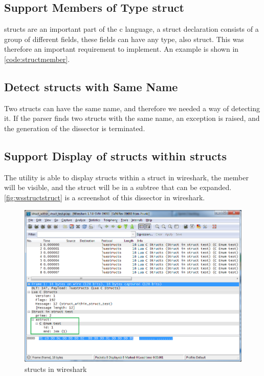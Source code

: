

\subsection{Support Members of Type \Gls{struct}}
\Glspl{struct} are an important part of the \Gls{c} language, a \gls{struct} declaration consists 
of a group of different fields, these fields can have any type, also \gls{struct}. 
This was therefore an important requirement to implement. An example is shown 
in \autoref{code:structmember}.



\subsection{Detect \Glspl{struct} with Same Name}
Two \glspl{struct} can have the same name, and therefore we needed a way of detecting it. 
If the \gls{parser} finds two \glspl{struct} with the same name, an exception is 
raised, and the generation of the \gls{dissector} is terminated.

\subsection{Support Display of \Glspl{struct} within \Glspl{struct}}
The \gls{utility} is able to display \glspl{struct} within a \gls{struct} in \Gls{wireshark}, the 
\gls{member} will be visible, and the \gls{struct} will be in a subtree that can be 
expanded. \autoref{fig:wsstructstruct} is a screenshot of this \gls{dissector} in 
\Gls{wireshark}.

\begin{figure}[ht]
	\center
	\includegraphics[width=\textwidth]{./sprints/img/wireshark_structwithstruct}
	\caption{\Glspl{struct} in \Gls{wireshark}\label{fig:wsstructstruct}}
\end{figure}

